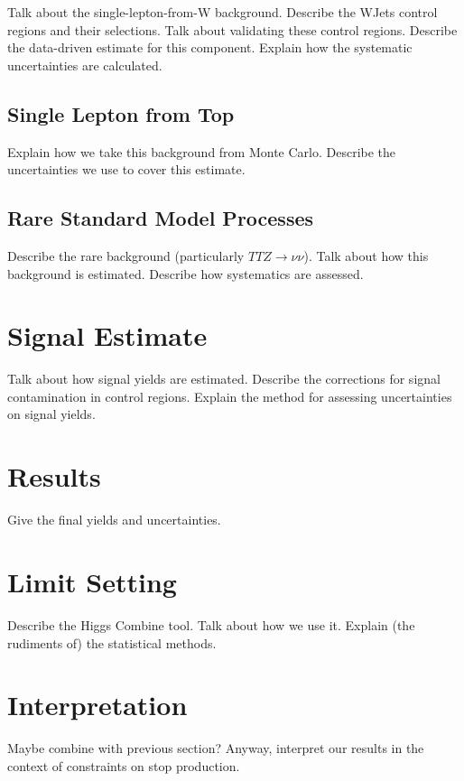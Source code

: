 Talk about the single-lepton-from-W background.
Describe the WJets control regions and their selections.
Talk about validating these control regions.
Describe the data-driven estimate for this component.
Explain how the systematic uncertainties are calculated.

\subsection{Single Lepton from Top}
\label{ssec:stop:1ltop}

Explain how we take this background from Monte Carlo.
Describe the uncertainties we use to cover this estimate.

\subsection{Rare Standard Model Processes}
\label{ssec:stop:1lrare}

Describe the rare background (particularly $TTZ \rightarrow \nu\nu$).
Talk about how this background is estimated.
Describe how systematics are assessed.

\section{Signal Estimate}
\label{sec:stop:signal}

Talk about how signal yields are estimated.
Describe the corrections for signal contamination in control regions.
Explain the method for assessing uncertainties on signal yields.

\section{Results}
\label{sec:stop:results}

Give the final yields and uncertainties.

\section{Limit Setting}
\label{sec:stop:limits}

Describe the Higgs Combine tool.
Talk about how we use it.
Explain (the rudiments of) the statistical methods.

\section{Interpretation}
\label{sec:stop:interp}

Maybe combine with previous section?
Anyway, interpret our results in the context of constraints on stop production.

